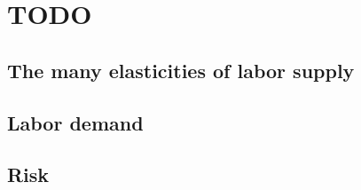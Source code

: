 \documentclass[12pt]{article}
\begin{document}
\section{TODO}
\subsection{The many elasticities of labor supply}
\subsection{Labor demand}
\subsection{Risk}
\end{document}
